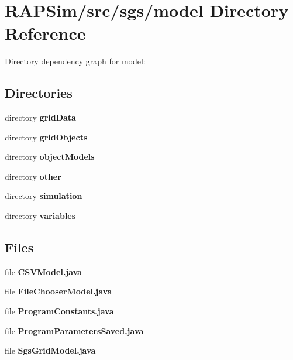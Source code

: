\section{R\-A\-P\-Sim/src/sgs/model Directory Reference}
\label{dir_2f0bce582130e3664de0c2ab4aa656eb}
Directory dependency graph for model\-:
\subsection*{Directories}
\begin{DoxyCompactItemize}
\item 
directory {\bf grid\-Data}
\item 
directory {\bf grid\-Objects}
\item 
directory {\bf object\-Models}
\item 
directory {\bf other}
\item 
directory {\bf simulation}
\item 
directory {\bf variables}
\end{DoxyCompactItemize}
\subsection*{Files}
\begin{DoxyCompactItemize}
\item 
file {\bf C\-S\-V\-Model.\-java}
\item 
file {\bf File\-Chooser\-Model.\-java}
\item 
file {\bf Program\-Constants.\-java}
\item 
file {\bf Program\-Parameters\-Saved.\-java}
\item 
file {\bf Sgs\-Grid\-Model.\-java}
\end{DoxyCompactItemize}

